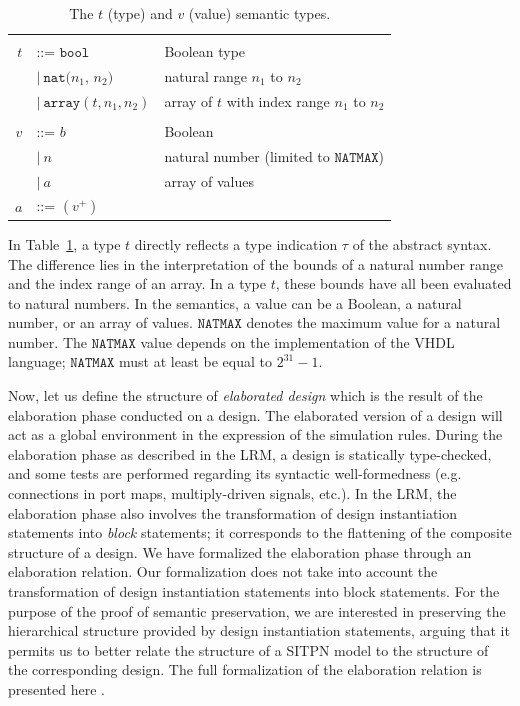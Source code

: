 \documentclass[pdflatex,sn-mathphys]{sn-jnl}%
\theoremstyle{thmstyleone}%
\theoremstyle{thmstyletwo}%
\theoremstyle{thmstylethree}%
\begin{document}
\begin{table}[!htbp]
  \caption{The $t$ (type) and $v$ (value) semantic types.}
  \label{tab:type-value}

  \begin{tabular}{|rll|}
    \hline
    && \\
    $t$ & ::= $\mathtt{bool}$ & Boolean type \\
    & \quad $\vert~\mathtt{nat}(n_1$, $n_2)$ & natural range $n_1$ to $n_2$ \\
    & \quad $\vert~\mathtt{array}(t, n_1, n_2)$ & array of $t$ with index range $n_1$ to $n_2$ \\
    & & \\
    $v$ & ::= $b$ & Boolean \\
    & \quad $\vert~{}n$ & natural number (limited to $\mathtt{NATMAX}$) \\
    & \quad $\vert~a$ & array of values \\
    $a$ & ::= $(v^{+})$ & \\
    \hline
  \end{tabular}    
\end{table}

In Table~\ref{tab:type-value}, a type $t$ directly reflects a type
indication $\tau$ of the abstract syntax. The difference lies in the
interpretation of the bounds of a natural number range and the index
range of an array. In a type $t$, these bounds have all been evaluated
to natural numbers. In the \hvhdl{} semantics, a value can be a
Boolean, a natural number, or an array of values. $\mathtt{NATMAX}$
denotes the maximum value for a natural number.  The $\mathtt{NATMAX}$
value depends on the implementation of the \textsf{VHDL} language;
$\mathtt{NATMAX}$ must at least be equal to $2^{31}-1$.

Now, let us define the structure of \textit{elaborated design} which
is the result of the elaboration phase conducted on a \hvhdl{}
design. The elaborated version of a design will act as a global
environment in the expression of the simulation rules. During the
elaboration phase as described in the LRM, a design is statically
type-checked, and some tests are performed regarding its syntactic
well-formedness (e.g. connections in port maps, multiply-driven
signals, etc.). In the LRM, the elaboration phase also involves the
transformation of design instantiation statements into \textit{block}
statements; it corresponds to the flattening of the composite
structure of a design.  We have formalized the elaboration phase
through an elaboration relation. Our formalization does not take into
account the transformation of design instantiation statements into
block statements. For the purpose of the proof of semantic
preservation, we are interested in preserving the hierarchical
structure provided by design instantiation statements, arguing that it
permits us to better relate the structure of a SITPN model to the
structure of the corresponding \hvhdl{} design. The full formalization
of the elaboration relation is presented here
\cite{Iampietro2022HVHDL}.
\end{document}
